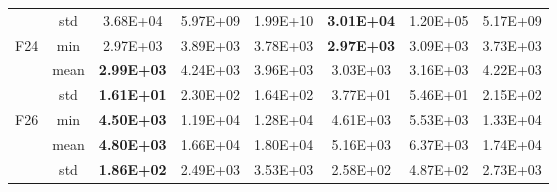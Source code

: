 \documentclass[preprint,review,compress,12pt]{elsarticle}
\begin{document}
\begin{table}[H]
{\begin{tabular}{cccccccc}
                     & std  & 3.68E+04          & 5.97E+09 & 1.99E+10 & \textbf{3.01E+04} & 1.20E+05 & 5.17E+09 \\
\multirow{3}{*}{F24} & min  & 2.97E+03          & 3.89E+03 & 3.78E+03 & \textbf{2.97E+03} & 3.09E+03 & 3.73E+03 \\
                     & mean & \textbf{2.99E+03} & 4.24E+03 & 3.96E+03 & 3.03E+03          & 3.16E+03 & 4.22E+03 \\
                     & std  & \textbf{1.61E+01} & 2.30E+02 & 1.64E+02 & 3.77E+01          & 5.46E+01 & 2.15E+02 \\
\multirow{3}{*}{F26} & min  & \textbf{4.50E+03} & 1.19E+04 & 1.28E+04 & 4.61E+03          & 5.53E+03 & 1.33E+04 \\
                     & mean & \textbf{4.80E+03} & 1.66E+04 & 1.80E+04 & 5.16E+03          & 6.37E+03 & 1.74E+04 \\
                     & std  & \textbf{1.86E+02} & 2.49E+03 & 3.53E+03 & 2.58E+02          & 4.87E+02 & 2.73E+03 \\
\bottomrule
\end{tabular}
}
\end{table}
\end{document}
